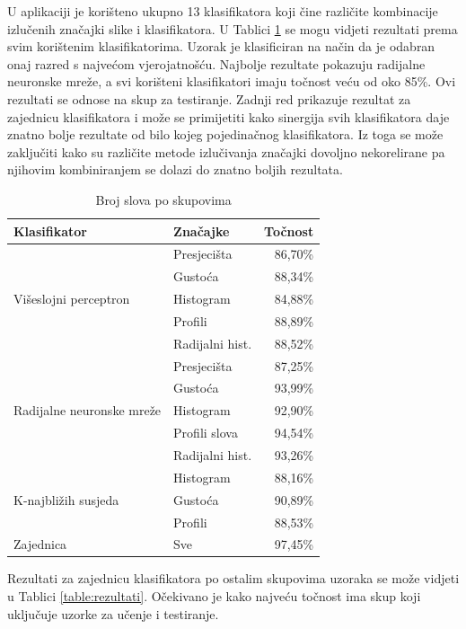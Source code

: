 \documentclass[a4paper,twocolumn,dvipdfm]{article}
\begin{document}
U aplikaciji je korišteno ukupno 13 klasifikatora koji čine različite
kombinacije izlučenih značajki slike i klasifikatora. U Tablici
\ref{table:rezPoKlasif} se mogu vidjeti rezultati prema svim korištenim
klasifikatorima. Uzorak je klasificiran na način da je odabran onaj razred s
najvećom vjerojatnošću. Najbolje rezultate pokazuju radijalne neuronske mreže, a
svi korišteni klasifikatori imaju točnost veću od oko 85\%. Ovi rezultati se
odnose na skup za testiranje. Zadnji red prikazuje rezultat za zajednicu
klasifikatora i može se primijetiti kako sinergija svih klasifikatora daje
znatno bolje rezultate od bilo kojeg pojedinačnog klasifikatora. Iz toga se može
zaključiti kako su različite metode izlučivanja značajki dovoljno nekorelirane
pa njihovim kombiniranjem se dolazi do znatno boljih rezultata.

\begin{table}[htb]
\centering
\begin{tabular}{llr} \toprule
Klasifikator & Značajke & Točnost \\
\midrule
\multirow{5}{2cm}{Višeslojni perceptron}
 & Presjecišta & 86,70\% \\
 & Gustoća & 88,34\% \\
 & Histogram & 84,88\% \\
 & Profili & 88,89\% \\
 & Radijalni hist. & 88,52\% \\
\midrule
\multirow{5}{2cm}{Radijalne neuronske mreže}
 & Presjecišta & 87,25\% \\
 & Gustoća & 93,99\% \\
 & Histogram & 92,90\% \\
 & Profili slova & 94,54\% \\
 & Radijalni hist. & 93,26\% \\
\midrule
\multirow{3}{2cm}{K-najbližih susjeda}
 & Histogram & 88,16\% \\
 & Gustoća & 90,89\% \\
 & Profili & 88,53\% \\
\midrule
\multirow{1}{2cm}{Zajednica}
 & Sve & 97,45\% \\
\bottomrule
\end{tabular}
\caption{Broj slova po skupovima}
\label{table:rezPoKlasif}
\end{table}

Rezultati za zajednicu klasifikatora po ostalim skupovima uzoraka se može
vidjeti u Tablici \ref{table:rezultati}. Očekivano je kako najveću točnost ima
skup koji uključuje uzorke za učenje i testiranje.
\end{document}
